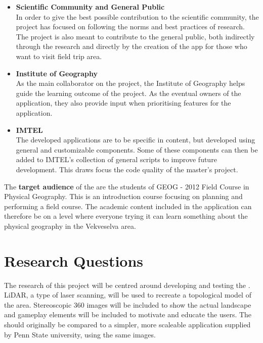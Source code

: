     \begin{itemize}
        
        \item \textbf{Scientific Community and General Public}\\
        In order to give the best possible contribution to the scientific community, the project has focused on following the norms and best practices of research. The project is also meant to contribute to the general public, both indirectly through the research and directly by the creation of the app for those who want to visit field trip area.
        
        \SPACE
        
        \item \textbf{Institute of Geography} \\
        As the main collaborator on the project, the Institute of Geography helps guide the learning outcome of the project. As the eventual owners of the application, they also provide input when prioritising features for the application.
        
        \SPACE
        
        \item \textbf{IMTEL} \\
        The developed applications are to be specific in content, but developed using general and customizable components. Some of these components can then be added to IMTEL's collection of general scripts to improve future development. This draws focus the code quality of the master's project.
    \end{itemize}
    
    The \textbf{target audience} of the \ApplicationName are the students of GEOG - 2012 Field Course in Physical Geography. This is an introduction course focusing on planning and performing a field course. The academic content included in the application can therefore be on a level where everyone trying it can learn something about the physical geography in the Vekveselva area.

\section{Research Questions}
    The research of this project will be centred around developing and testing the \textbf{ \ApplicationName}. LiDAR, a type of laser scanning, will be used to recreate a topological model of the area. Stereoscopic 360 images will be included to show the actual landscape and gameplay elements will be included to motivate and educate the users. The \ApplicationName \hspace{0.1cm} should originally be compared to a simpler, more scaleable application supplied by Penn State university, using the same images.
    
